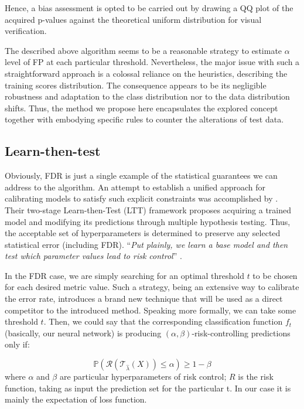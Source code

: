 \documentclass{article}
\begin{document}
Hence, a bias assessment is opted to be carried out by drawing a QQ plot of the acquired p-values against the theoretical uniform distribution for visual verification.

The described above algorithm seems to be a reasonable strategy to estimate $\alpha$ level of FP at each particular threshold. Nevertheless, the major issue with such a straightforward approach is a colossal reliance on the heuristics, describing the training scores distribution. The consequence appears to be its negligible robustness and adaptation to the class distribution nor to the data distribution shifts. Thus, the method we propose here 
encapsulates the explored concept together with embodying specific rules to counter the alterations of test data.

\subsection{Learn-then-test}

Obviously, FDR is just a single example of the statistical guarantees we can address to the algorithm. An attempt to establish a unified approach for calibrating models to satisfy such explicit constraints was accomplished by \cite{ltt}. Their two-stage Learn-then-Test (LTT) framework proposes acquiring a trained model and modifying its predictions through multiple hypothesis testing. Thus, the acceptable set of hyperparameters is determined to preserve any selected statistical error (including FDR). “\textit{Put plainly, we learn a base model and then test which parameter values lead to risk control}” \cite{ltt}. 

In the FDR case, we are simply searching for an optimal threshold $t$ to be chosen for each desired metric value. Such a strategy, being an extensive way to calibrate the error rate, introduces a brand new technique that will be used as a direct competitor to the introduced method. Speaking more formally, we can take some threshold $t$. Then, we could say that the corresponding classification function $f_t$ (basically, our neural network) is producing $(\alpha, \beta)$-risk-controlling predictions only if:

\begin{equation}
        \mathbb{P}(\mathcal{R}(\mathcal{T}_{\hat{\lambda}}(X)) \leq \alpha) \geq 1 - \beta
\end{equation}
where $\alpha$ and $\beta$ are particular hyperparameters of risk control; $R$ is the risk function, taking as input the prediction set for the particular t. In our case it is mainly the expectation of loss function. 
\end{document}
